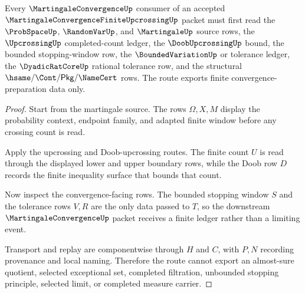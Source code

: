 \begin{theorem}
\label{thm:martingale-convergence-finite-upcrossing-route}
Every $\MartingaleConvergenceUp$ consumer of an accepted
$\MartingaleConvergenceFiniteUpcrossingUp$ packet must first read the
$\ProbSpaceUp$, $\RandomVarUp$, and $\MartingaleUp$ source rows, the
$\UpcrossingUp$ completed-count ledger, the $\DoobUpcrossingUp$ bound, the
bounded stopping-window row, the $\BoundedVariationUp$ or tolerance ledger, the
$\DyadicRatCoreUp$ rational tolerance row, and the structural
$\hsame/\Cont/\mathsf{Pkg}/\NameCert$ rows. The route exports finite
convergence-preparation data only.
\end{theorem}
\begin{proof}
Start from the martingale source. The rows $\Omega,X,M$ display the probability
context, endpoint family, and adapted finite window before any crossing count is
read.

Apply the upcrossing and Doob-upcrossing routes. The finite count $U$ is read
through the displayed lower and upper boundary rows, while the Doob row $D$
records the finite inequality surface that bounds that count.

Now inspect the convergence-facing rows. The bounded stopping window $S$ and
the tolerance rows $V,R$ are the only data passed to $T$, so the downstream
$\MartingaleConvergenceUp$ packet receives a finite ledger rather than a
limiting event.

Transport and replay are componentwise through $H$ and $C$, with $P,N$ recording
provenance and local naming. Therefore the route cannot export an almost-sure
quotient, selected exceptional set, completed filtration, unbounded stopping
principle, selected limit, or completed measure carrier.
\end{proof}

